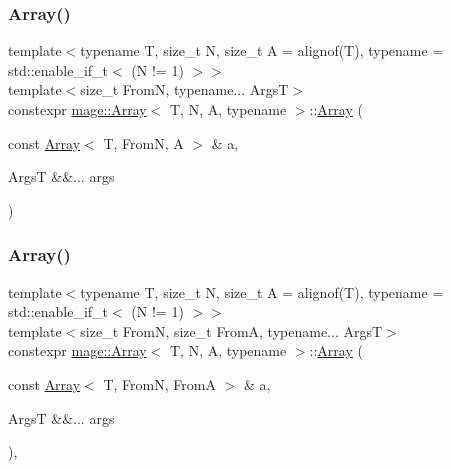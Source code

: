 \subsubsection{\texorpdfstring{Array()}{Array()}\hspace{0.1cm}{\footnotesize\ttfamily [6/10]}}
{\footnotesize\ttfamily template$<$typename T, size\+\_\+t N, size\+\_\+t A = alignof(\+T), typename  = std\+::enable\+\_\+if\+\_\+t$<$ (\+N != 1) $>$$>$ \\
template$<$size\+\_\+t FromN, typename... ArgsT$>$ \\
constexpr \mbox{\hyperlink{structmage_1_1_array}{mage\+::\+Array}}$<$ T, N, A, typename $>$\+::\mbox{\hyperlink{structmage_1_1_array}{Array}} (\begin{DoxyParamCaption}\item[{const \mbox{\hyperlink{structmage_1_1_array}{Array}}$<$ T, FromN, A $>$ \&}]{a,  }\item[{ArgsT \&\&...}]{args }\end{DoxyParamCaption})\hspace{0.3cm}{\ttfamily [noexcept]}}

\mbox{\label{structmage_1_1_array_a4952f767cdedb8c2874391dc4d9b74c3}} 
\subsubsection{\texorpdfstring{Array()}{Array()}\hspace{0.1cm}{\footnotesize\ttfamily [7/10]}}
{\footnotesize\ttfamily template$<$typename T, size\+\_\+t N, size\+\_\+t A = alignof(\+T), typename  = std\+::enable\+\_\+if\+\_\+t$<$ (\+N != 1) $>$$>$ \\
template$<$size\+\_\+t FromN, size\+\_\+t FromA, typename... ArgsT$>$ \\
constexpr \mbox{\hyperlink{structmage_1_1_array}{mage\+::\+Array}}$<$ T, N, A, typename $>$\+::\mbox{\hyperlink{structmage_1_1_array}{Array}} (\begin{DoxyParamCaption}\item[{const \mbox{\hyperlink{structmage_1_1_array}{Array}}$<$ T, FromN, FromA $>$ \&}]{a,  }\item[{ArgsT \&\&...}]{args }\end{DoxyParamCaption})\hspace{0.3cm}{\ttfamily [explicit]}, {\ttfamily [noexcept]}}

